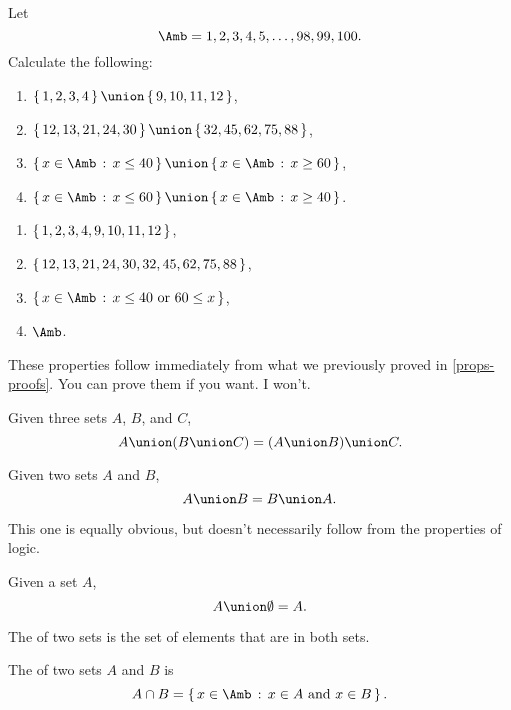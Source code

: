 \begin{example}
  Let $$\Amb = {1,2,3,4,5,\dots,98,99,100}.$$ Calculate the following:

  \begin{enumerate}
  \item $\mset{1,2,3,4} \union \mset{9,10,11,12}$,
  \item $\mset{12, 13,21,24,30} \union \mset{32,45,62,75,88}$,
  \item $\scomp{x \in \Amb}{x \le 40} \union \scomp{x \in \Amb}{x \ge 60}$,
  \item $\scomp{x \in \Amb}{x \le 60} \union \scomp{x \in \Amb}{x \ge 40}$.
  \end{enumerate}

  \begin{solution}
    \begin{enumerate}
    \item $\left\{ \, 1,2,3,4,9,10,11,12 \, \right\}$,
    \item $\left\{ \, 12, 13,21,24, 30, 32,45,62,75,88 \, \right\}$,
    \item $\scomp{x \in \Amb}{x \le 40 \tor 60 \le x}$,
    \item $\Amb$.
    \end{enumerate}
  \end{solution}
\end{example}

These properties follow immediately from what we previously proved in
\cref{props-proofs}. You can prove them if you want. I won't.

\begin{lemma}
  Given three sets $A$, $B$, and $C$, $$A \union (B \union C) = (A
  \union B) \union C.$$
\end{lemma}

\begin{lemma}
  Given two sets $A$ and $B$, $$A \union B = B \union A.$$
\end{lemma}

This one is equally obvious, but doesn't necessarily follow from the
properties of logic.

\begin{lemma}
  Given a set $A$, $$A \union \emptyset = A.$$
\end{lemma}

 The
 of two sets is the set of elements that are in
both sets.

\begin{definition}
  The  of two sets $A$ and $B$ is
  $$A \cap B = \scomp{x \in \Amb}{x \in A \tand x \in B}.$$
\end{definition}

